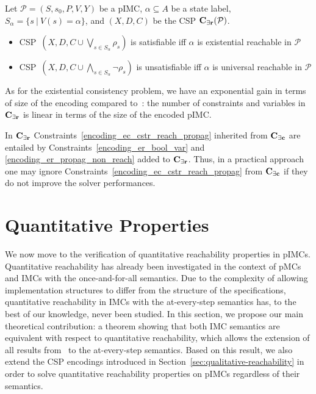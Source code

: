 \documentclass{llncs}
\newcommand{\imc}{\textnormal{IMC}}
\newcommand{\pimc}{\textnormal{pIMC}}
\newcommand{\pmc}{\textnormal{pMC}}
\newcommand{\csp}{\textnormal{CSP}}
\newcommand{\Mec} {\ensuremath{{\bf C_{{\exists}c}}}}
\newcommand{\Mer}{\ensuremath{{\bf C_{{\exists}r}}}}
\newcommand{\custompar}[1]{\smallskip \noindent {\bf #1}}
\begin{document}
\begin{proposition}\label{prop:model_existential_reachability}
	Let $\mathcal{P} = (S, s_0 , P, V, Y)$ be a \pimc, 
    $\alpha \subseteq A$ be a state label, 
    $S_\alpha = \{s \ | \ V(s) = \alpha\}$,
    and $(X,D,C)$ be the {\csp} $\Mer(\mathcal{P})$.
    \vspace*{-0.15cm}
    \begin{itemize}
    	\item 
			\csp\ $(X,D,C \cup \bigvee_{s \in S_\alpha} \rho_s)$
    		is satisfiable iff 
    		$\alpha$ is existential reachable in $\mathcal{P}$
   		\item
			\csp\ $(X,D,C \cup \bigwedge_{s \in S_\alpha} \neg\rho_s)$
    		is unsatisfiable iff 
    		$\alpha$ is universal reachable in $\mathcal{P}$
	\end{itemize}
\end{proposition}

As for the existential consistency problem, 
we have an exponential gain in terms of size of the encoding
compared to~\cite{DelahayeLP16}:
the number of constraints and variables in {\Mer} is linear
in terms of the size of the encoded {\pimc}.

\custompar{Remark.}
In $\Mer$ Constraints~\ref{encoding_ec_cstr_reach_propag} inherited from $\Mec$
are entailed by Constraints~\ref{encoding_er_bool_var} and \ref{encoding_er_propag_non_reach} added to $\Mer$. 
Thus, in a practical approach one may ignore Constraints~\ref{encoding_ec_cstr_reach_propag} from $\Mec$ 
if they do not improve the solver performances.

\section{Quantitative Properties}\hspace*{0cm}
\label{sec:quantitative}


We now move to the verification of quantitative reachability
properties in {\pimc}s. Quantitative reachability has already been
investigated in the context of {\pmc}s and {\imc}s with the
once-and-for-all semantics. Due to the complexity of allowing
implementation structures to differ from the structure of the
specifications, quantitative reachability in {\imc}s with the
at-every-step semantics has, to the best of our knowledge, never been
studied. In this section, we propose our main theoretical contribution: a theorem
showing that both {\imc} semantics are equivalent with respect to
quantitative reachability, which allows the extension of all results
from~\cite{tulip,benedikt2013ltl} to the at-every-step semantics. Based on this result, we
also extend the CSP encodings introduced in
Section~\ref{sec:qualitative-reachability} in order to solve quantitative
reachability properties on {\pimc}s regardless of their semantics.
\end{document}
